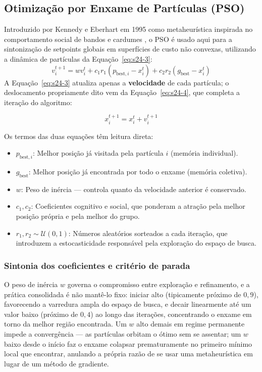 \documentclass[12pt,a4paper]{article}
\numberwithin{equation}{section}
\numberwithin{table}{section}
\numberwithin{figure}{section}
\begin{document}
{	\subsection{Otimização por Enxame de Partículas (PSO)}
	Introduzido por Kennedy e Eberhart em 1995 como metaheurística inspirada no comportamento social de bandos e cardumes \cite{pso}, o PSO é usado aqui para a sintonização de setpoints globais em superfícies de custo não convexas, utilizando a dinâmica de partículas da Equação~\eqref{eq:s24-3}:
	\begin{equation}\label{eq:s24-3}
 v_{i}^{t+1} = w v_{i}^t + c_1 r_1 (p_{\text{best},i} - x_{i}^t) + c_2 r_2 (g_{\text{best}} - x_{i}^t)
\end{equation}
	A Equação~\eqref{eq:s24-3} atualiza apenas a \textbf{velocidade} de cada partícula; o deslocamento propriamente dito vem da Equação~\eqref{eq:s24-4}, que completa a iteração do algoritmo:

	\begin{equation}\label{eq:s24-4}
	x_i^{t+1} = x_i^t + v_i^{t+1}
\end{equation}

	Os termos das duas equações têm leitura direta:
	\begin{itemize}
		\item $p_{\text{best},i}$: Melhor posição já visitada pela partícula $i$ (memória individual).
		\item $g_{\text{best}}$: Melhor posição já encontrada por todo o enxame (memória coletiva).
		\item $w$: Peso de inércia — controla quanto da velocidade anterior é conservado.
		\item $c_1, c_2$: Coeficientes cognitivo e social, que ponderam a atração pela melhor posição própria e pela melhor do grupo.
		\item $r_1, r_2 \sim \mathcal{U}(0,1)$: Números aleatórios sorteados a cada iteração, que introduzem a estocasticidade responsável pela exploração do espaço de busca.
	\end{itemize}

	\subsubsection*{Sintonia dos coeficientes e critério de parada}

	O peso de inércia $w$ governa o compromisso entre exploração e refinamento, e a prática consolidada é não mantê-lo fixo: iniciar alto (tipicamente próximo de $0{,}9$), favorecendo a varredura ampla do espaço de busca, e decair linearmente até um valor baixo (próximo de $0{,}4$) ao longo das iterações, concentrando o enxame em torno da melhor região encontrada. Um $w$ alto demais em regime permanente impede a convergência — as partículas orbitam o ótimo sem se assentar; um $w$ baixo desde o início faz o enxame colapsar prematuramente no primeiro mínimo local que encontrar, anulando a própria razão de se usar uma metaheurística em lugar de um método de gradiente.

}
\end{document}
